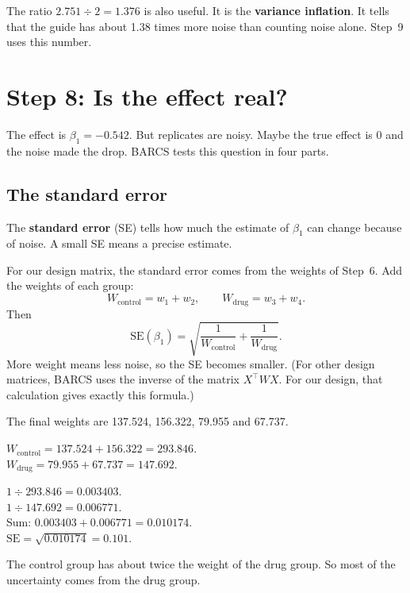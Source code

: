 \documentclass[12pt]{article}
\begin{document}
The ratio $2.751 \div 2 = 1.376$ is also useful. It is the
\textbf{variance inflation}. It tells that the guide has about 1.38 times
more noise than counting noise alone. Step~9 uses this number.

\section{Step 8: Is the effect real?}

The effect is $\beta_1 = -0.542$. But replicates are noisy. Maybe the true
effect is 0 and the noise made the drop. BARCS tests this question in four
parts.

\subsection{The standard error}

The \textbf{standard error} (SE) tells how much the estimate of $\beta_1$
can change because of noise. A small SE means a precise estimate.

For our design matrix, the standard error comes from the weights of Step~6.
Add the weights of each group:
\[
W_{\text{control}} = w_1 + w_2, \qquad W_{\text{drug}} = w_3 + w_4.
\]
Then
\[
\text{SE}(\beta_1) = \sqrt{\frac{1}{W_{\text{control}}} +
\frac{1}{W_{\text{drug}}}}.
\]
More weight means less noise, so the SE becomes smaller. (For other design
matrices, BARCS uses the inverse of the matrix $X^{\top} W X$. For our design,
that calculation gives exactly this formula.)

\begin{worked}
The final weights are 137.524, 156.322, 79.955 and 67.737.

$W_{\text{control}} = 137.524 + 156.322 = 293.846$.\\
$W_{\text{drug}} = 79.955 + 67.737 = 147.692$.

$1 \div 293.846 = 0.003403$.\\
$1 \div 147.692 = 0.006771$.\\
Sum: $0.003403 + 0.006771 = 0.010174$.\\
$\text{SE} = \sqrt{0.010174} = 0.101$.

The control group has about twice the weight of the drug group. So most of
the uncertainty comes from the drug group.
\end{worked}
\end{document}
